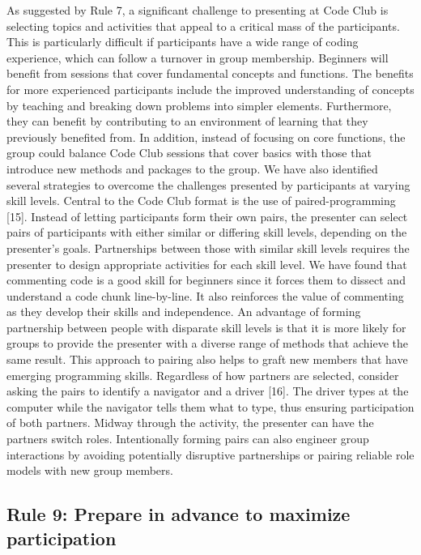 \documentclass[
  11pt,
]{article}
\begin{document}
As suggested by Rule 7, a significant challenge to presenting at Code
Club is selecting topics and activities that appeal to a critical mass
of the participants. This is particularly difficult if participants have
a wide range of coding experience, which can follow a turnover in group
membership. Beginners will benefit from sessions that cover fundamental
concepts and functions. The benefits for more experienced participants
include the improved understanding of concepts by teaching and breaking
down problems into simpler elements. Furthermore, they can benefit by
contributing to an environment of learning that they previously
benefited from. In addition, instead of focusing on core functions, the
group could balance Code Club sessions that cover basics with those that
introduce new methods and packages to the group. We have also identified
several strategies to overcome the challenges presented by participants
at varying skill levels. Central to the Code Club format is the use of
paired-programming {[}15{]}. Instead of letting participants form their
own pairs, the presenter can select pairs of participants with either
similar or differing skill levels, depending on the presenter's goals.
Partnerships between those with similar skill levels requires the
presenter to design appropriate activities for each skill level. We have
found that commenting code is a good skill for beginners since it forces
them to dissect and understand a code chunk line-by-line. It also
reinforces the value of commenting as they develop their skills and
independence. An advantage of forming partnership between people with
disparate skill levels is that it is more likely for groups to provide
the presenter with a diverse range of methods that achieve the same
result. This approach to pairing also helps to graft new members that
have emerging programming skills. Regardless of how partners are
selected, consider asking the pairs to identify a navigator and a driver
{[}16{]}. The driver types at the computer while the navigator tells
them what to type, thus ensuring participation of both partners. Midway
through the activity, the presenter can have the partners switch roles.
Intentionally forming pairs can also engineer group interactions by
avoiding potentially disruptive partnerships or pairing reliable role
models with new group members.

\hypertarget{rule-9-prepare-in-advance-to-maximize-participation}{%
\subsection{Rule 9: Prepare in advance to maximize
participation}\label{rule-9-prepare-in-advance-to-maximize-participation}}
\end{document}
